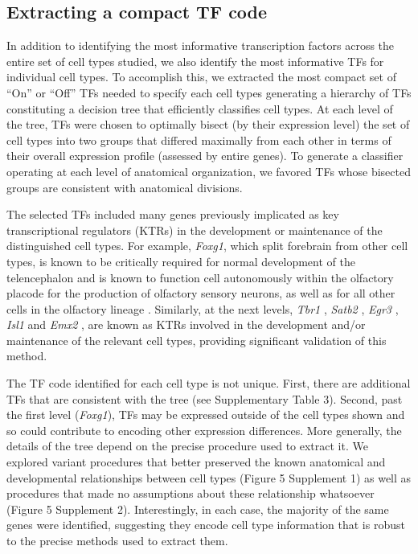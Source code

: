 \subsection{Extracting a compact TF code}
In addition to identifying the most informative transcription factors across the entire set of cell types studied, we also identify the most informative TFs for individual cell types. To accomplish this, we extracted the most compact set of “On” or “Off” TFs needed to specify each cell types generating a hierarchy of TFs constituting a decision tree \citep{Saeys_2007} that efficiently classifies cell types\citep{Gabitto_2016}. At each level of the tree, TFs were chosen to optimally bisect (by their expression level) the set of cell types into two groups that differed maximally from each other in terms of their overall expression profile (assessed by entire genes). To generate a classifier operating at each level of anatomical organization, we favored TFs whose bisected groups are consistent with anatomical divisions.

The selected TFs included many genes previously implicated as key transcriptional regulators (KTRs) in the development or maintenance of the distinguished cell types. For example, \textit{Foxg1}, which split forebrain from other cell types, is known to be critically required for normal development of the telencephalon \citep{Xuan_1995, Danesin_2012} and is known to function cell autonomously within the olfactory placode for the production of olfactory sensory neurons, as well as for all other cells in the olfactory lineage \citep{Duggan_2008}. 
Similarly, at the next levels, \textit{Tbr1} \citep{Bedogni_2010}, \textit{Satb2} \citep{Sweeney_2017}, \textit{Egr3} \citep{Chandra_2015}, \textit{Isl1} \citep{Lu_2013} and \textit{Emx2} \citep{Zhang_2016}, are known as KTRs involved in the development and/or maintenance of the relevant cell types, providing significant validation of this method.

The TF code identified for each cell type is not unique. First, there are additional TFs that are consistent with the tree (see Supplementary Table 3). Second, past the first level (\textit{Foxg1}), TFs may be expressed outside of the cell types shown and so could contribute to encoding other expression differences. More generally, the details of the tree depend on the precise procedure used to extract it. We explored variant procedures that better preserved the known anatomical and developmental relationships between cell types (Figure 5 Supplement 1) as well as procedures that made no assumptions about these relationship whatsoever (Figure 5 Supplement 2). Interestingly, in each case, the majority of the same genes were identified, suggesting they encode cell type information that is robust to the precise methods used to extract them.

